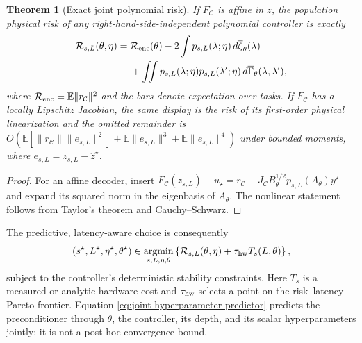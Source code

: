 \documentclass[11pt]{article}
\newtheorem{theorem}{Theorem}
\newcommand{\E}{\mathbb E}
\begin{document}
\begin{theorem}[Exact joint polynomial risk]
\label{thm:joint-polynomial-risk}
If $F_{\mathcal C}$ is affine in $z$, the population physical risk of any
right-hand-side-independent polynomial controller is exactly
\begin{align}
 \mathcal R_{s,L}(\theta,\eta)
 ={}&\mathcal R_{\rm enc}(\theta)
 -2\int p_{s,L}(\lambda;\eta)\,
 d\overline\zeta_\theta(\lambda)\notag\\
 &+\iint p_{s,L}(\lambda;\eta)
 p_{s,L}(\lambda';\eta)\,
 d\overline\Gamma_\theta(\lambda,\lambda'),
 \label{eq:exact-joint-risk}
\end{align}
where $\mathcal R_{\rm enc}=\E\|r_{\mathcal C}\|^2$ and the bars denote
expectation over tasks.  If $F_{\mathcal C}$ has a locally Lipschitz Jacobian,
the same display is the risk of its first-order physical linearization and
the omitted remainder is
$O(\E[\|r_{\mathcal C}\|\|e_{s,L}\|^2]
+\E\|e_{s,L}\|^3+\E\|e_{s,L}\|^4)$ under bounded moments, where
$e_{s,L}=z_{s,L}-\widehat z^\star$.
\end{theorem}
\begin{proof}
For an affine decoder, insert
$F_{\mathcal C}(z_{s,L})-u_\star
=r_{\mathcal C}-J_{\mathcal C}B_\theta^{1/2}
p_{s,L}(A_\theta)y^\star$ and expand its squared norm in the eigenbasis of
$A_\theta$.  The nonlinear statement follows from Taylor's theorem and
Cauchy--Schwarz.
\end{proof}

The predictive, latency-aware choice is consequently
\begin{equation}
 (s^\star,L^\star,\eta^\star,\theta^\star)
 \in\operatorname*{argmin}_{s,L,\eta,\theta}
 \left\{\mathcal R_{s,L}(\theta,\eta)
 +\tau_{\rm hw}T_s(L,\theta)\right\},
 \label{eq:joint-hyperparameter-predictor}
\end{equation}
subject to the controller's deterministic stability constraints.  Here
$T_s$ is a measured or analytic hardware cost and $\tau_{\rm hw}$ selects a
point on the risk--latency Pareto frontier.  Equation
\eqref{eq:joint-hyperparameter-predictor} predicts the preconditioner through
$\theta$, the controller, its depth, and its scalar hyperparameters jointly;
it is not a post-hoc convergence bound.
\end{document}
